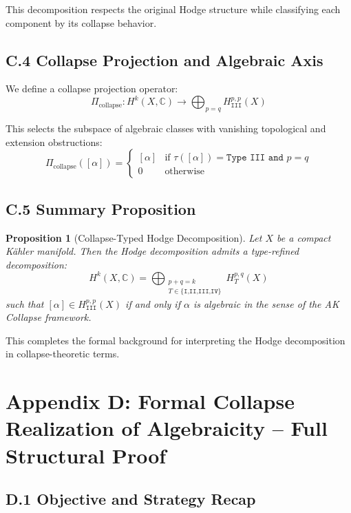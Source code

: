 \documentclass[11pt]{article}
\newtheorem{proposition}[theorem]{Proposition}
\begin{document}
This decomposition respects the original Hodge structure while classifying each component by its collapse behavior.

\subsection*{C.4 Collapse Projection and Algebraic Axis}

We define a collapse projection operator:
\[
\Pi_{\text{collapse}}: H^k(X, \mathbb{C}) \to \bigoplus_{p=q} H^{p,p}_{\texttt{III}}(X)
\]

This selects the subspace of algebraic classes with vanishing topological and extension obstructions:
\[
\Pi_{\text{collapse}}([\alpha]) = 
\begin{cases}
[\alpha] & \text{if } \tau([\alpha]) = \texttt{Type III and } p=q \\
0 & \text{otherwise}
\end{cases}
\]

\subsection*{C.5 Summary Proposition}

\begin{proposition}[Collapse-Typed Hodge Decomposition]
Let $X$ be a compact Kähler manifold. Then the Hodge decomposition admits a type-refined decomposition:
\[
H^k(X, \mathbb{C}) = \bigoplus_{\substack{p+q=k \\ T \in \{\texttt{I,II,III,IV}\}}} H^{p,q}_T(X)
\]
such that $[\alpha] \in H^{p,p}_{\texttt{III}}(X)$ if and only if $\alpha$ is algebraic in the sense of the AK Collapse framework.
\end{proposition}

This completes the formal background for interpreting the Hodge decomposition in collapse-theoretic terms.



\section*{Appendix D: Formal Collapse Realization of Algebraicity – Full Structural Proof}


\subsection*{D.1 Objective and Strategy Recap}
\end{document}
